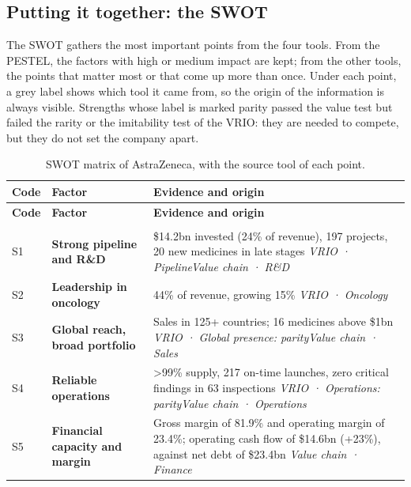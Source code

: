 \subsection{Putting it together: the SWOT}
The SWOT gathers the most important points from the four tools. From the PESTEL, the factors with high or medium impact are kept; from the other tools, the points that matter most or that come up more than once. Under each point, a grey label shows which tool it came from, so the origin of the information is always visible. Strengths whose label is marked parity passed the value test but failed the rarity or the imitability test of the VRIO: they are needed to compete, but they do not set the company apart.

\begin{xltabular}{\linewidth}{@{}lp{3.6cm}Y@{}}
\caption{SWOT matrix of AstraZeneca, with the source tool of each point.}\label{tab:swot}\\*
\toprule
\textbf{Code} & \textbf{Factor} & \textbf{Evidence and origin} \\*
\midrule
\endfirsthead
\toprule
\textbf{Code} & \textbf{Factor} & \textbf{Evidence and origin} \\*
\midrule
\endhead
\bottomrule
\endfoot
{} \\*
\midrule
S1 & \textbf{Strong pipeline and R\&D} & \$14.2bn invested (24\% of revenue), 197 projects, 20 new medicines in late stages \cite[pp.~28, 30, 125]{AR} \newline \textit{\small VRIO · Pipeline\quad Value chain · R\&D} \\
S2 & \textbf{Leadership in oncology} & 44\% of revenue, growing 15\% \cite[pp.~2, 4, 13]{AR} \newline \textit{\small VRIO · Oncology} \\
S3 & \textbf{Global reach, broad portfolio} & Sales in 125+ countries; 16 medicines above \$1bn \cite[pp.~4, 32]{AR} \newline \textit{\small VRIO · Global presence: parity\quad Value chain · Sales} \\
S4 & \textbf{Reliable operations} & >99\% supply, 217 on-time launches, zero critical findings in 63 inspections \cite[pp.~4, 27, 31]{AR} \newline \textit{\small VRIO · Operations: parity\quad Value chain · Operations} \\
S5 & \textbf{Financial capacity and margin} & Gross margin of 81.9\% and operating margin of 23.4\%; operating cash flow of \$14.6bn (+23\%), against net debt of \$23.4bn \cite[pp.~10, 61, 125]{AR} \newline \textit{\small Value chain · Finance} \\

\end{xltabular}
